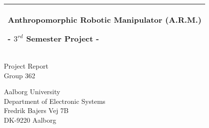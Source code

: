 
%
\begin{titlepage}
  \addtolength{\hoffset}{0.5\evensidemargin-0.5\oddsidemargin} %
  \noindent%
  \begin{tabular}{@{}p{\textwidth}@{}}
    \toprule[2pt]
    \midrule
    \vspace{0.2cm}
    \begin{center}
    \Huge{\textbf{
      Anthropomorphic Robotic Manipulator (A.R.M.)
    }}
    \end{center}
    \begin{center}
      \Large{
        - $3^{rd}$ Semester Project -%
      }
    \end{center}
    \vspace{0.2cm}\\
    \midrule
    \toprule[2pt]
  \end{tabular}
  \vspace{0.1 cm}
  
  \begin{center}
   {\large
      Project Report%
    }\\
    \vspace{0.2cm}
    {\Large
      Group 362\\%
      \vspace{0.8 cm}
    }

  \end{center}
  \vfill
  \begin{center}
  Aalborg University\\
  Department of Electronic Systems\\
  Fredrik Bajers Vej 7B\\
  DK-9220 Aalborg\\
  \end{center}
\end{titlepage}
\clearpage
